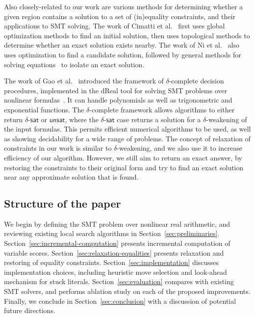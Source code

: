 \documentclass[runningheads]{llncs}
\begin{document}
Also closely-related to our work are various methods for determining whether a given region contains a solution to a set of (in)equality constraints, and their applications to SMT solving. The work of Cimatti et al.~\cite{CimattiGLS22} first uses global optimization methods to find an initial solution, then uses topological methods to determine whether an exact solution exists nearby. The work of Ni et al.~\cite{NiWX23} also uses optimization to find a candidate solution, followed by general methods for solving equations~\cite{LiXZ23b} to isolate an exact solution.

The work of Gao et al.~\cite{GaoAC12IJCAR,GaoAC12LICS} introduced the framework of $\delta$-complete decision procedures, implemented in the \textsf{dReal} tool for solving SMT problems over nonlinear formulas~\cite{GaoKC13}. It can handle polynomials as well as trigonometric and exponential functions. The $\delta$-complete framework allows algorithms to either return $\delta$-$\mathsf{sat}$ or $\mathsf{unsat}$, where the $\delta$-$\mathsf{sat}$ case returns a solution for a $\delta$-weakening of the input formulas. This permits efficient numerical algorithms to be used, as well as showing decidability for a wide range of problems. The concept of relaxation of constraints in our work is similar to $\delta$-weakening, and we also use it to increase efficiency of our algorithm. However, we still aim to return an exact answer, by restoring the constraints to their original form and try to find an exact solution near any approximate solution that is found.

\subsection{Structure of the paper}

We begin by defining the SMT problem over nonlinear real arithmetic, and reviewing existing local search algorithms in Section~\ref{sec:preliminaries}. Section~\ref{sec:incremental-computation} presents incremental computation of variable scores. Section~\ref{sec:relaxation-equalities} presents relaxation and restoring of equality constraints. Section~\ref{sec:implementation} discusses implementation choices, including heuristic move selection and look-ahead mechanism for stuck literals. Section~\ref{sec:evaluation} compares with existing SMT solvers, and performs ablation study on each of the proposed improvements. Finally, we conclude in Section~\ref{sec:conclusion} with a discussion of potential future directions.
\end{document}
